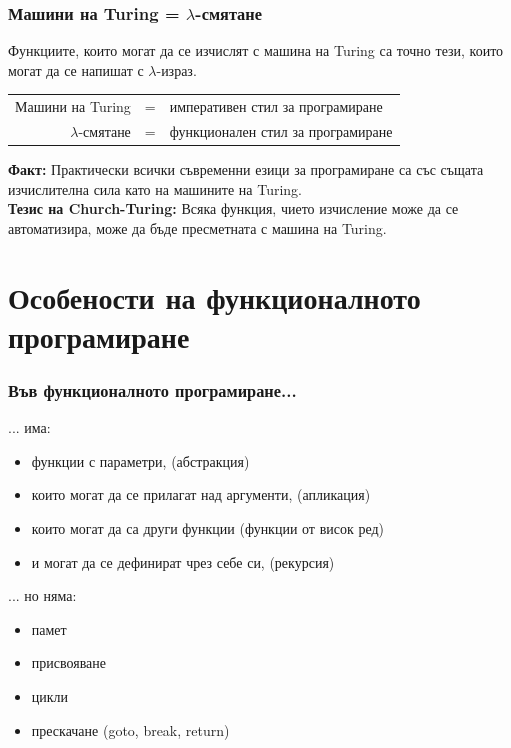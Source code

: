 \documentclass{beamer}
\begin{document}
\begin{frame}
  \frametitle{Машини на Turing = $\lambda$-смятане}

  \begin{theorem}
  Функциите, които могат да се изчислят с машина на Turing са точно тези, които могат да се напишат с $\lambda$-израз.
  \end{theorem}
  \pause
  \begin{center}
    \begin{tabular}{|rcl|}
      \hline
      Машини на Turing & = & императивен стил за програмиране\\
      $\lambda$-смятане & = & функционален стил за програмиране\\
      \hline
    \end{tabular}
  \end{center}
  \pause
  \textbf{Факт: }Практически всички съвременни езици за програмиране са със същата изчислителна сила като на машините на Turing.\\[1em]
  \pause
  \textbf{Тезис на Church-Turing:} Всяка функция, чието изчисление може да се автоматизира, може да бъде пресметната с машина на Turing.
\end{frame}

\section*{Особености на функционалното програмиране}

\begin{frame}
  \frametitle{Във функционалното програмиране...}

  ... има:
  \begin{itemize}[<+->]
  \item функции с параметри, (абстракция)
  \item които могат да се прилагат над аргументи, (апликация)
  \item които могат да са други функции (функции от висок ред)
  \item и могат да се дефинират чрез себе си, (рекурсия)
  \end{itemize}
  \onslide<+->
  ... но няма:
  \begin{itemize}[<+->]
  \item памет
  \item присвояване
  \item цикли
  \item прескачане (goto, break, return)
  \end{itemize}
\end{frame}
\end{document}
